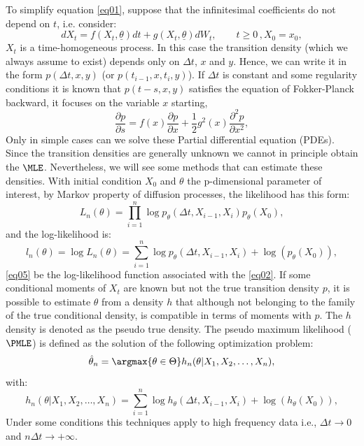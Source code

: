 To simplify equation \eqref{eq01}, suppose that the infinitesimal coefficients do not depend on $t$, i.e. consider:
\begin{equation}\label{eq02}
  dX_{t}= f(X_{t},\underline{\theta}) dt + g(X_{t},\underline{\theta}) dW_{t}, \quad \quad t \geq 0 \, , X_{0} = x_{0},
\end{equation}
$X_t$ is a time-homogeneous process. In this case the transition density (which we always assume to exist) depends only on $\Delta t$, $x$ and $y$. Hence, we can write it in the form $p(\Delta t,x,y)$ (or $p(t_{i-1},x,t_{i},y)$). If $\Delta t$ is constant and some regularity conditions it is known that $p(t-s,x,y)$ satisfies the equation of Fokker-Planck backward, it focuses on the variable $x$ starting,
\begin{equation}\label{eq03}
  \frac{\partial p}{\partial s} = f(x) \frac{\partial p}{\partial x} + \frac{1}{2}g^{2}(x)\frac{\partial^{2}p }{\partial x^{2}} ,
\end{equation}
Only in simple cases can we solve these Partial differential equation (PDEs). Since the transition densities are generally unknown we cannot in principle obtain the $\MLE$. Nevertheless, we will see some methods that can estimate these densities. With initial condition $X_0$ and $\theta$ the $\mathrm{p}$-dimensional parameter of interest, by Markov property of diffusion processes, the likelihood has this form:
\begin{equation}\label{eq04}
  L_{n}(\theta)=\prod_{i=1}^{n} \log p_{\theta}(\Delta t, X_{i-1},X_{i}) p_{\theta}(X_{0}),
\end{equation}
and the log-likelihood is:
\begin{equation}\label{eq05}
  l_{n}(\theta)=\log L_{n}(\theta)=\sum_{i=1}^{n} \log p_{\theta}(\Delta t, X_{i-1},X_{i}) + \log (p_{\theta}(X_{0})),
\end{equation}
\eqref{eq05} be the log-likelihood function associated with the \eqref{eq02}. If some conditional moments of $X_t$ are known but not the true transition density $p$, it is possible to estimate $\theta$ from a density $h$ that although not belonging to the family of the true conditional density, is compatible in terms of moments with $p$. The $h$ density is denoted as the pseudo true density. The pseudo maximum likelihood ($\PMLE$) is defined as the solution of the following optimization problem:
\begin{equation}\label{eq06}
\hat{\theta}_{n}=\argmax {\theta \in \Theta} h_{n}(\theta|X_{1},X_{2},\dots,X_{n}),
\end{equation}
with:
\begin{equation}\label{eq07}
  h_{n}(\theta|X_{1},X_{2},\dots,X_{n})=\sum_{i=1}^{n} \log h_{\theta}(\Delta t, X_{i-1},X_{i}) + \log (h_{\theta}(X_{0})),
\end{equation}
Under some conditions this techniques apply to high frequency data i.e., $\Delta t \rightarrow 0$ and $n \Delta t \rightarrow +\infty$.


